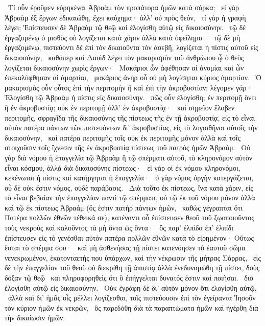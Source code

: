 ~Τί οὖν ἐροῦμεν εὑρηκέναι Ἀβραὰμ τὸν προπάτορα ἡμῶν κατὰ σάρκα;
~εἰ γὰρ Ἀβραὰμ ἐξ ἔργων ἐδικαιώθη, ἔχει καύχημα· ἀλλ’ οὐ πρὸς θεόν,
~τί γὰρ ἡ γραφὴ λέγει; Ἐπίστευσεν δὲ Ἀβραὰμ τῷ θεῷ καὶ ἐλογίσθη αὐτῷ εἰς δικαιοσύνην.
~τῷ δὲ ἐργαζομένῳ ὁ μισθὸς οὐ λογίζεται κατὰ χάριν ἀλλὰ κατὰ ὀφείλημα·
~τῷ δὲ μὴ ἐργαζομένῳ, πιστεύοντι δὲ ἐπὶ τὸν δικαιοῦντα τὸν ἀσεβῆ, λογίζεται ἡ πίστις αὐτοῦ εἰς δικαιοσύνην,
~καθάπερ καὶ Δαυὶδ λέγει τὸν μακαρισμὸν τοῦ ἀνθρώπου ᾧ ὁ θεὸς λογίζεται δικαιοσύνην χωρὶς ἔργων·
~Μακάριοι ὧν ἀφέθησαν αἱ ἀνομίαι καὶ ὧν ἐπεκαλύφθησαν αἱ ἁμαρτίαι,
~μακάριος ἀνὴρ οὗ οὐ μὴ λογίσηται κύριος ἁμαρτίαν.
~Ὁ μακαρισμὸς οὖν οὗτος ἐπὶ τὴν περιτομὴν ἢ καὶ ἐπὶ τὴν ἀκροβυστίαν; λέγομεν γάρ· Ἐλογίσθη τῷ Ἀβραὰμ ἡ πίστις εἰς δικαιοσύνην.
~πῶς οὖν ἐλογίσθη; ἐν περιτομῇ ὄντι ἢ ἐν ἀκροβυστίᾳ; οὐκ ἐν περιτομῇ ἀλλ’ ἐν ἀκροβυστίᾳ·
~καὶ σημεῖον ἔλαβεν περιτομῆς, σφραγῖδα τῆς δικαιοσύνης τῆς πίστεως τῆς ἐν τῇ ἀκροβυστίᾳ, εἰς τὸ εἶναι αὐτὸν πατέρα πάντων τῶν πιστευόντων δι’ ἀκροβυστίας, εἰς τὸ λογισθῆναι αὐτοῖς τὴν δικαιοσύνην,
~καὶ πατέρα περιτομῆς τοῖς οὐκ ἐκ περιτομῆς μόνον ἀλλὰ καὶ τοῖς στοιχοῦσιν τοῖς ἴχνεσιν τῆς ἐν ἀκροβυστίᾳ πίστεως τοῦ πατρὸς ἡμῶν Ἀβραάμ.
~Οὐ γὰρ διὰ νόμου ἡ ἐπαγγελία τῷ Ἀβραὰμ ἢ τῷ σπέρματι αὐτοῦ, τὸ κληρονόμον αὐτὸν εἶναι κόσμου, ἀλλὰ διὰ δικαιοσύνης πίστεως·
~εἰ γὰρ οἱ ἐκ νόμου κληρονόμοι, κεκένωται ἡ πίστις καὶ κατήργηται ἡ ἐπαγγελία·
~ὁ γὰρ νόμος ὀργὴν κατεργάζεται, οὗ δὲ οὐκ ἔστιν νόμος, οὐδὲ παράβασις.
~Διὰ τοῦτο ἐκ πίστεως, ἵνα κατὰ χάριν, εἰς τὸ εἶναι βεβαίαν τὴν ἐπαγγελίαν παντὶ τῷ σπέρματι, οὐ τῷ ἐκ τοῦ νόμου μόνον ἀλλὰ καὶ τῷ ἐκ πίστεως Ἀβραάμ (ὅς ἐστιν πατὴρ πάντων ἡμῶν,
~καθὼς γέγραπται ὅτι Πατέρα πολλῶν ἐθνῶν τέθεικά σε), κατέναντι οὗ ἐπίστευσεν θεοῦ τοῦ ζῳοποιοῦντος τοὺς νεκροὺς καὶ καλοῦντος τὰ μὴ ὄντα ὡς ὄντα·
~ὃς παρ’ ἐλπίδα ἐπ’ ἐλπίδι ἐπίστευσεν εἰς τὸ γενέσθαι αὐτὸν πατέρα πολλῶν ἐθνῶν κατὰ τὸ εἰρημένον· Οὕτως ἔσται τὸ σπέρμα σου·
~καὶ μὴ ἀσθενήσας τῇ πίστει κατενόησεν τὸ ἑαυτοῦ σῶμα νενεκρωμένον, ἑκατονταετής που ὑπάρχων, καὶ τὴν νέκρωσιν τῆς μήτρας Σάρρας,
~εἰς δὲ τὴν ἐπαγγελίαν τοῦ θεοῦ οὐ διεκρίθη τῇ ἀπιστίᾳ ἀλλὰ ἐνεδυναμώθη τῇ πίστει, δοὺς δόξαν τῷ θεῷ
~καὶ πληροφορηθεὶς ὅτι ὃ ἐπήγγελται δυνατός ἐστιν καὶ ποιῆσαι.
~διὸ ἐλογίσθη αὐτῷ εἰς δικαιοσύνην.
~Οὐκ ἐγράφη δὲ δι’ αὐτὸν μόνον ὅτι ἐλογίσθη αὐτῷ,
~ἀλλὰ καὶ δι’ ἡμᾶς οἷς μέλλει λογίζεσθαι, τοῖς πιστεύουσιν ἐπὶ τὸν ἐγείραντα Ἰησοῦν τὸν κύριον ἡμῶν ἐκ νεκρῶν,
~ὃς παρεδόθη διὰ τὰ παραπτώματα ἡμῶν καὶ ἠγέρθη διὰ τὴν δικαίωσιν ἡμῶν.

